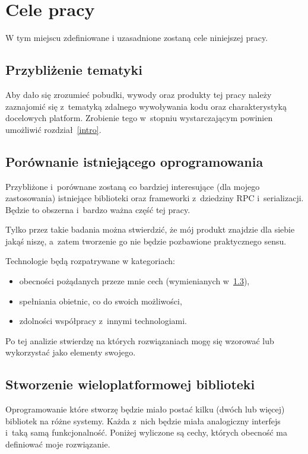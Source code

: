 \section{Cele pracy}
W tym miejscu zdefiniowane i uzasadnione zostaną cele niniejszej pracy.


\subsection{Przybliżenie tematyki}
Aby dało się zrozumieć pobudki, wywody oraz produkty tej pracy należy zaznajomić się z~tematyką zdalnego wywoływania kodu oraz charakterystyką docelowych platform. Zrobienie tego w~stopniu wystarczającym powinien umożliwić rozdział~\ref{intro}.

\subsection{Porównanie istniejącego oprogramowania}
Przybliżone i~porównane zostaną co bardziej interesujące (dla mojego zastosowania) istniejące biblioteki oraz frameworki z~dziedziny RPC i~serializacji. Będzie to obszerna i~bardzo ważna część tej pracy.

Tylko przez takie badania można stwierdzić, że mój produkt znajdzie dla siebie jakąś niszę, a~zatem tworzenie go nie będzie pozbawione praktycznego sensu.

Technologie będą rozpatrywane w kategoriach:
\begin{itemize}
	\item obecności pożądanych przeze mnie cech (wymienianych w~\ref{lib-requirements}),
	\item spełniania obietnic, co do swoich możliwości,
	\item zdolności współpracy z~innymi technologiami.
\end{itemize}

Po tej analizie stwierdzę na których rozwiązaniach mogę się wzorować lub wykorzystać jako elementy swojego.

\subsection{Stworzenie wieloplatformowej biblioteki}
\label{lib-requirements}
Oprogramowanie które stworzę będzie miało postać kilku (dwóch lub więcej) bibliotek na różne systemy. Każda z~nich będzie miała analogiczny interfejs i~taką samą funkcjonalność. Poniżej wyliczone są cechy, których obecność ma definiować moje rozwiązanie.


